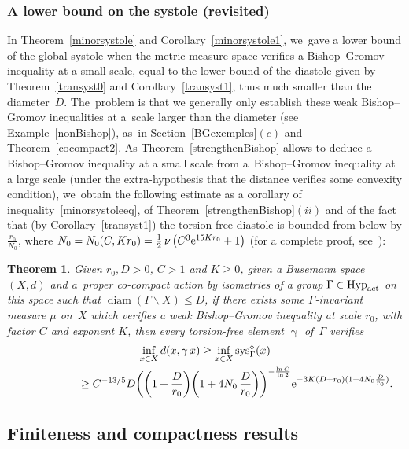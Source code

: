 \documentclass[10pt,a4paper]{amsart}
\numberwithin{equation}{section}
\newtheorem{theor}{Theorem}[section]
\newcommand{\sys}{\operatorname{sys}}
\newcommand{\diam}{\operatorname{diam}}
\newcommand{\g}{\operatorname{\gamma}}
\begin{document}
\subsubsection{A lower bound on the systole (revisited)}%

In Theorem~\ref{minorsystole} and Corollary~\ref{minorsystole1}, we~gave a lower bound of the global systole when the metric measure space verifies a
Bishop--Gromov inequality at a small scale, equal to the lower bound of the diastole given by Theorem~\ref{transyst0} and Corollary~\ref{transyst1}, thus
much smaller than the diameter~$D$. The~problem is that we generally only
establish these weak Bishop--Gromov ineq\-ualities at a~scale larger than the
diameter (see Example~\ref{nonBishop}), as~in Section~\ref{BGexemples}$(c)$ and Theorem~\ref{cocompact2}. As Theo\-rem~\ref{strengthenBishop} allows to deduce a Bishop--Gromov inequality at a small scale from
a~Bishop--Gromov inequality at a large scale (under the extra-hypothesis that the distance verifies some convexity condition), we~obtain the following estimate
as a corollary of inequality~\eqref{minorsystoleeq}, of Theo\-rem~\ref{strengthenBishop}$(ii)$ and of the fact that (by Corollary~\ref{transyst1}) the torsion-free diastole is bounded from below by $\frac{r_0}{N_0}$,
where $N_0 = N_0 (C, Kr_0)= \frac{1}{2} \,\nu \left(C^3 {\rm e}^{15 K r_0} + 1\right)$ (for a complete proof, see~\cite{BCGS2}):

\begin{theor}\label{minorsystole5}
{\sloppy
Given $r_0, D >0$, $C > 1 $ and $K\ge 0$, given a Busemann space $(X,d)$
and a~proper co-compact action by isometries of a group
$\Gamma \in \text{\rm Hyp}_{\rm act}$ on this space such that $\diam (\Gamma \backslash X) \le D$, if there exists some
$\Gamma$-invariant measure $\mu$ on~$X$ which verifies a weak Bishop--Gromov inequality at scale $r_0$, with factor $C$ and exponent $K$, then every torsion-free element $\g$ of~$\Gamma$ verifies
\begin{gather*}
\inf_{x \in X} d(x, \g x) \ge \inf_{x \in X} \sys^{\diamond}_\Gamma (x)
\\ \hphantom{\inf_{x \in X} d(x, \g x) }
{}\ge C^{-13/5} D \bigg(\bigg(1 + \frac{D}{r_0}\bigg) \bigg(1 + 4 N_0\,\frac{D}{r_0}\bigg)\bigg)^{-\frac{\ln C}{\ln 2}} {\rm e}^{ - 3 K (D+ r_0) ( 1 + 4 N_0 \frac{D}{r_0})}.
\end{gather*}}
\end{theor}

\subsection{Finiteness and compactness results}\label{finicompact}
\end{document}
